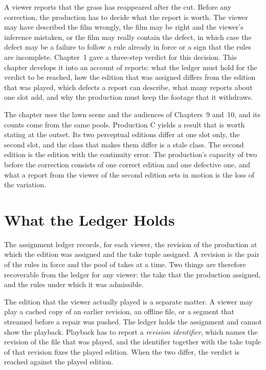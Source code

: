\documentclass[11pt,twoside,openright]{book}
\theoremstyle{plain}
\theoremstyle{definition}
\theoremstyle{remark}
\begin{document}
A viewer reports that the grass has reappeared after the cut. Before any correction, the production has to decide what the report is worth. The viewer may have described the film wrongly, the film may be right and the viewer's inference mistaken, or the film may really contain the defect, in which case the defect may be a failure to follow a rule already in force or a sign that the rules are incomplete. Chapter~1 gave a three-step verdict for this decision. This chapter develops it into an account of reports: what the ledger must hold for the verdict to be reached, how the edition that was assigned differs from the edition that was played, which defects a report can describe, what many reports about one slot add, and why the production must keep the footage that it withdraws.

The chapter uses the lawn scene and the audiences of Chapters~9 and~10, and its counts come from the same pools. Production C yields a result that is worth stating at the outset. Its two perceptual editions differ at one slot only, the second slot, and the class that makes them differ is a stale class. The second edition is the edition with the continuity error. The production's capacity of two before the correction consists of one correct edition and one defective one, and what a report from the viewer of the second edition sets in motion is the loss of the variation.

\section{What the Ledger Holds}\label{sec:ledger-ch7}

The assignment ledger records, for each viewer, the revision of the production at which the edition was assigned and the take tuple assigned. A revision is the pair of the rules in force and the pool of takes at a time. Two things are therefore recoverable from the ledger for any viewer: the take that the production assigned, and the rules under which it was admissible.

The edition that the viewer actually played is a separate matter. A viewer may play a cached copy of an earlier revision, an offline file, or a segment that streamed before a repair was pushed. The ledger holds the assignment and cannot show the playback. Playback has to report a \emph{revision identifier}, which names the revision of the file that was played, and the identifier together with the take tuple of that revision fixes the played edition. When the two differ, the verdict is reached against the played edition.
\end{document}
